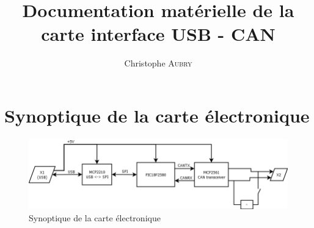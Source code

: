 \documentclass[a4paper]{scrreprt}
\title{Documentation matérielle de la carte interface USB - CAN}
\author{Christophe \textsc{Aubry}}
\begin{document}
\maketitle

\tableofcontents

\section{Synoptique de la carte électronique}

\begin{figure}[h!]
	\centering
	\includegraphics[width=1.0\linewidth]{pictures/bloc_diag}
	\caption{Synoptique de la carte électronique}
	\label{fig:blocdiag}
\end{figure}
\end{document}
